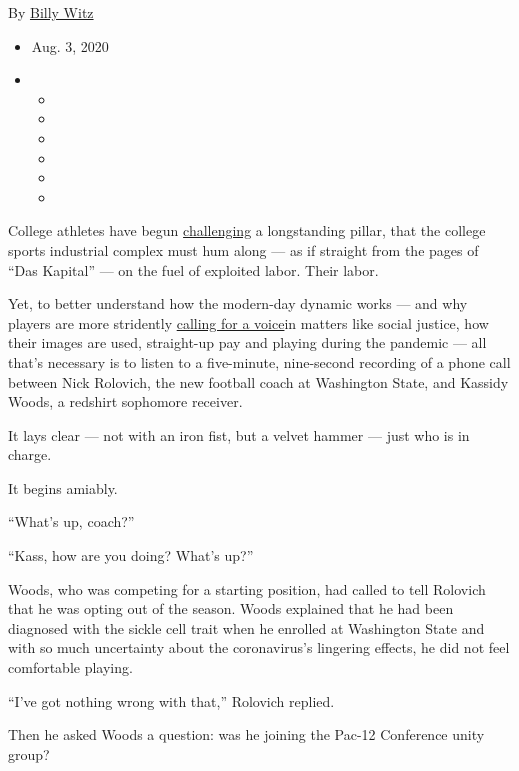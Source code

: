 By \href{https://www.nytimes3xbfgragh.onion/by/billy-witz}{Billy Witz}

\begin{itemize}
\item
  Aug. 3, 2020
\item
  \begin{itemize}
  \item
  \item
  \item
  \item
  \item
  \item
  \end{itemize}
\end{itemize}

College athletes have begun
\href{https://www.nytimes3xbfgragh.onion/2020/06/12/sports/ncaafootball/george-floyd-protests-college-sports.html}{challenging}
a longstanding pillar, that the college sports industrial complex must
hum along --- as if straight from the pages of ``Das Kapital'' --- on
the fuel of exploited labor. Their labor.

Yet, to better understand how the modern-day dynamic works --- and why
players are more stridently
\href{https://www.nytimes3xbfgragh.onion/2020/08/02/sports/ncaafootball/coronavirus-college-football-pac-12.html}{calling
for a voice}in matters like social justice, how their images are used,
straight-up pay and playing during the pandemic --- all that's necessary
is to listen to a five-minute, nine-second recording of a phone call
between Nick Rolovich, the new football coach at Washington State, and
Kassidy Woods, a redshirt sophomore receiver.

It lays clear --- not with an iron fist, but a velvet hammer --- just
who is in charge.

It begins amiably.

``What's up, coach?''

``Kass, how are you doing? What's up?''

Woods, who was competing for a starting position, had called to tell
Rolovich that he was opting out of the season. Woods explained that he
had been diagnosed with the sickle cell trait when he enrolled at
Washington State and with so much uncertainty about the coronavirus's
lingering effects, he did not feel comfortable playing.

``I've got nothing wrong with that,'' Rolovich replied.

Then he asked Woods a question: was he joining the Pac-12 Conference
unity group?

